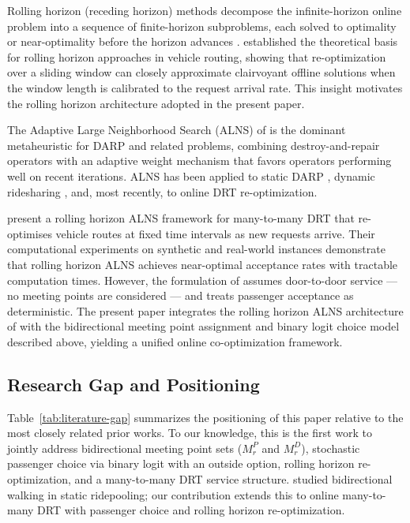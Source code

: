 Rolling horizon (receding horizon) methods decompose the infinite-horizon online problem into a sequence of finite-horizon subproblems, each solved to optimality or near-optimality before the horizon advances \citep{bent2004}. \citet{bent2004} established the theoretical basis for rolling horizon approaches in vehicle routing, showing that re-optimization over a sliding window can closely approximate clairvoyant offline solutions when the window length is calibrated to the request arrival rate. This insight motivates the rolling horizon architecture adopted in the present paper.

The Adaptive Large Neighborhood Search (ALNS) of \citet{ropke2006} is the dominant metaheuristic for DARP and related problems, combining destroy-and-repair operators with an adaptive weight mechanism that favors operators performing well on recent iterations. ALNS has been applied to static DARP \citep{parragh2008a}, dynamic ridesharing \citep{agatz2012}, and, most recently, to online DRT re-optimization.

\citet{wu2025} present a rolling horizon ALNS framework for many-to-many DRT that re-optimises vehicle routes at fixed time intervals as new requests arrive. Their computational experiments on synthetic and real-world instances demonstrate that rolling horizon ALNS achieves near-optimal acceptance rates with tractable computation times. However, the formulation of \citet{wu2025} assumes door-to-door service — no meeting points are considered — and treats passenger acceptance as deterministic. The present paper integrates the rolling horizon ALNS architecture of \citet{wu2025} with the bidirectional meeting point assignment and binary logit choice model described above, yielding a unified online co-optimization framework.

\subsection{Research Gap and Positioning}

Table~\ref{tab:literature-gap} summarizes the positioning of this paper relative to the most closely related prior works. To our knowledge, this is the first work to jointly address bidirectional meeting point sets ($M_r^P$ and $M_r^D$), stochastic passenger choice via binary logit with an outside option, rolling horizon re-optimization, and a many-to-many DRT service structure. \citet{fielbaum2021} studied bidirectional walking in static ridepooling; our contribution extends this to online many-to-many DRT with passenger choice and rolling horizon re-optimization.

